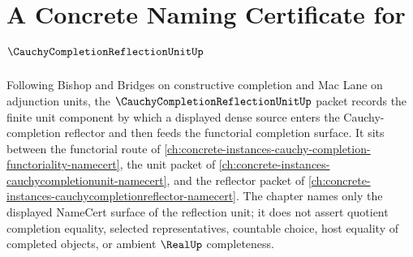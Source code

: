 \chapter{A Concrete Naming Certificate for $\CauchyCompletionReflectionUnitUp$}
\label{ch:concrete-instances-cauchy-completion-reflection-unit-namecert}

Following Bishop and Bridges on constructive completion and Mac Lane on adjunction units, the $\CauchyCompletionReflectionUnitUp$ packet records the finite unit component by which a displayed dense source enters the Cauchy-completion reflector and then feeds the functorial completion surface. It sits between the functorial route of \autoref{ch:concrete-instances-cauchy-completion-functoriality-namecert}, the unit packet of \autoref{ch:concrete-instances-cauchycompletionunit-namecert}, and the reflector packet of \autoref{ch:concrete-instances-cauchycompletionreflector-namecert}. The chapter names only the displayed NameCert surface of the reflection unit; it does not assert quotient completion equality, selected representatives, countable choice, host equality of completed objects, or ambient $\RealUp$ completeness.

